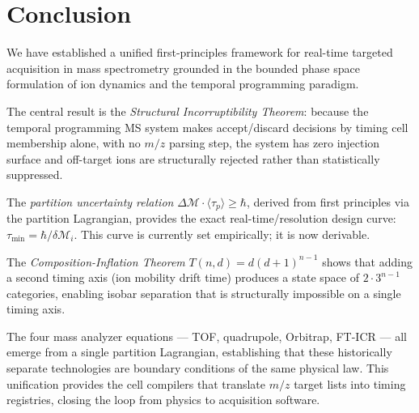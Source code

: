 \documentclass[twocolumn,10pt,a4paper]{article}
\theoremstyle{thmstyle}
\theoremstyle{definition}
\theoremstyle{remark}
\newcommand{\Mop}{\mathcal{M}}
\newcommand{\tp}{\langle\tau_{p}\rangle}
\begin{document}
\section{Conclusion}
\label{sec:conclusion}

We have established a unified first-principles framework for real-time
targeted acquisition in mass spectrometry grounded in the bounded phase
space formulation of ion dynamics and the temporal programming paradigm.

The central result is the \emph{Structural Incorruptibility Theorem}:
because the temporal programming MS system makes accept/discard decisions
by timing cell membership alone, with no $m/z$ parsing step, the system
has zero injection surface and off-target ions are structurally rejected
rather than statistically suppressed.

The \emph{partition uncertainty relation} $\Delta\Mop \cdot \tp \geq \hbar$,
derived from first principles via the partition Lagrangian, provides the
exact real-time/resolution design curve: $\tau_{\min} = \hbar/\delta\Mop_i$.
This curve is currently set empirically; it is now derivable.

The \emph{Composition-Inflation Theorem} $T(n,d) = d(d+1)^{n-1}$ shows
that adding a second timing axis (ion mobility drift time) produces a
state space of $2 \cdot 3^{n-1}$ categories, enabling isobar separation
that is structurally impossible on a single timing axis.

The four mass analyzer equations --- TOF, quadrupole, Orbitrap, FT-ICR ---
all emerge from a single partition Lagrangian, establishing that these
historically separate technologies are boundary conditions of the same
physical law. This unification provides the cell compilers that translate
$m/z$ target lists into timing registries, closing the loop from
physics to acquisition software.



\end{document}
